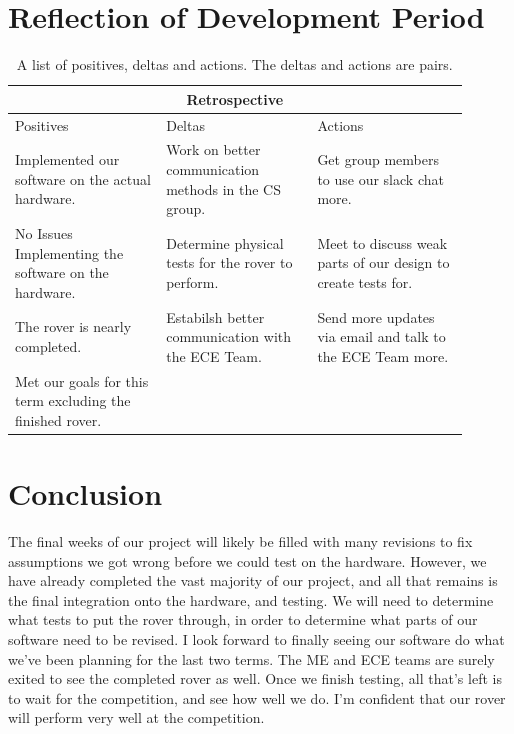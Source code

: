 \documentclass[10pt,letterpaper,onecolumn,journal]{IEEEtran}
\begin{document}
\section{Reflection of Development Period}
\begin{table}[H]
\begin{tabular}{ |p{0.3\linewidth}|p{0.3\linewidth}|p{0.3\linewidth}|  }
  \hline
  \multicolumn{3}{|c|}{Retrospective} \\
  \hline
  Positives& Deltas &Actions \\
  \hline
  Implemented our software on the actual hardware. &
  Work on better communication methods in the CS group. &
  Get group members to use our slack chat more. \\
  
  No Issues Implementing the software on the hardware. &
  Determine physical tests for the rover to perform. &
  Meet to discuss weak parts of our design to create tests for. \\
  
  The rover is nearly completed. &
  Estabilsh better communication with the ECE Team. &
  Send more updates via email and talk to the ECE Team more. \\

  Met our goals for this term excluding the finished rover. &
  & \\
  \hline
\end{tabular}
\caption{A list of positives, deltas and actions. The deltas and actions are pairs.}
\end{table}
\section{Conclusion}
The final weeks of our project will likely be filled with many revisions to fix assumptions we got wrong before we could test on the hardware. However, we have already completed the vast majority of our project, and all that remains is the final integration onto the hardware, and testing. We will need to determine what tests to put the rover through, in order to determine what parts of our software need to be revised. I look forward to finally seeing our software do what we've been planning for the last two terms. The ME and ECE teams are surely exited to see the completed rover as well. Once we finish testing, all that's left is to wait for the competition, and see how well we do. I'm confident that our rover will perform very well at the competition.
\end{document}
